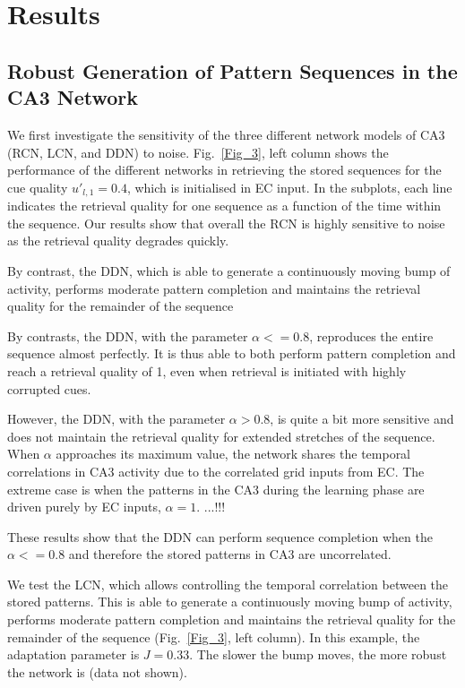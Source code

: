 \documentclass[utf8]{frontiersSCNS} %
\begin{document}
\section{Results}
\subsection{Robust Generation of Pattern Sequences in the CA3 Network}

We first investigate the sensitivity of the three different network models of CA3 (RCN, LCN, and DDN) to noise. Fig.~\ref{Fig_3}, left column shows the performance of the different networks in retrieving the stored sequences for the cue quality $u'_{l, 1} = 0.4$, which is initialised in EC input. In the subplots, each line indicates the retrieval quality for one sequence as a function of the time within the sequence. Our results show that overall the RCN is highly sensitive to noise as the retrieval quality degrades quickly.  


By contrast, the DDN, which is able to generate a continuously moving bump of activity, performs moderate pattern completion and maintains the retrieval quality for the remainder of the sequence 

By contrasts, the DDN, with the parameter $\alpha <= 0.8$, reproduces the entire sequence almost perfectly. It is thus able to both perform pattern completion and reach a retrieval quality of 1, even when retrieval is initiated with highly corrupted cues. 

However, the DDN, with the parameter $\alpha > 0.8$, is quite a bit more sensitive and does not maintain the retrieval quality for extended stretches of the sequence. When $\alpha$ approaches its maximum value, the network shares the temporal correlations in CA3 activity due to the correlated grid inputs from EC. The extreme case is when the patterns in the CA3 during the learning phase are driven purely by EC inputs, $\alpha = 1$. ...!!!
   

These results show that the DDN can perform sequence completion when the $\alpha <= 0.8$ and therefore the stored patterns in CA3 are uncorrelated.
 
We test the LCN, which allows controlling the temporal correlation between the stored patterns. This is able to generate a continuously moving bump of activity, performs moderate pattern completion and maintains the retrieval quality for the remainder of the sequence (Fig.~\ref{Fig_3}, left column).
In this example, the adaptation parameter is $J = 0.33$. The slower the bump moves, the more robust the network is (data not shown).
\end{document}

